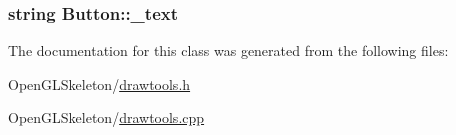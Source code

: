 \subsubsection[{\texorpdfstring{\+\_\+text}{_text}}]{\setlength{\rightskip}{0pt plus 5cm}string Button\+::\+\_\+text}\hypertarget{class_button_a0ed4e8d42b8e0b1c0b37790aca110c5e}{}\label{class_button_a0ed4e8d42b8e0b1c0b37790aca110c5e}


The documentation for this class was generated from the following files\+:\begin{DoxyCompactItemize}
\item 
Open\+G\+L\+Skeleton/\hyperlink{drawtools_8h}{drawtools.\+h}\item 
Open\+G\+L\+Skeleton/\hyperlink{drawtools_8cpp}{drawtools.\+cpp}\end{DoxyCompactItemize}

